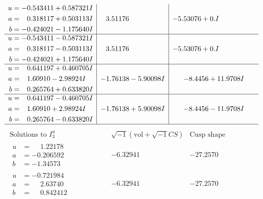 \documentclass[1p]{elsarticle_modified}
\theoremstyle{definition}
\newcommand{\I}{\sqrt{-1}}
\begin{document}
$$\begin{array}{c|c|c}
\begin{aligned}
u &= -0.543411 + 0.587321 I \\
a &= \phantom{-}0.318117 + 0.503113 I \\
b &= -0.424021 - 1.175640 I\end{aligned}
 & \phantom{-}3.51176\phantom{ +0.000000I} & -5.53076 + 0. I\phantom{ +0.000000I} \\ \hline\begin{aligned}
u &= -0.543411 - 0.587321 I \\
a &= \phantom{-}0.318117 - 0.503113 I \\
b &= -0.424021 + 1.175640 I\end{aligned}
 & \phantom{-}3.51176\phantom{ +0.000000I} & -5.53076 + 0. I\phantom{ +0.000000I} \\ \hline\begin{aligned}
u &= \phantom{-}0.641197 + 0.460705 I \\
a &= \phantom{-}1.60910 - 2.98924 I \\
b &= \phantom{-}0.265764 + 0.633820 I\end{aligned}
 & -1.76138 - 5.90098 I & -8.4456 + 11.9708 I \\ \hline\begin{aligned}
u &= \phantom{-}0.641197 - 0.460705 I \\
a &= \phantom{-}1.60910 + 2.98924 I \\
b &= \phantom{-}0.265764 - 0.633820 I\end{aligned}
 & -1.76138 + 5.90098 I & -8.4456 - 11.9708 I\\
 \hline 
 \end{array}$$\newpage$$\begin{array}{c|c|c}  
\text{Solutions to }I^u_{3}& \I (\text{vol} + \sqrt{-1}CS) & \text{Cusp shape}\\
 \hline 
\begin{aligned}
u &= \phantom{-}1.22178\phantom{ +0.000000I} \\
a &= -0.206592\phantom{ +0.000000I} \\
b &= -1.34573\phantom{ +0.000000I}\end{aligned}
 & -6.32941\phantom{ +0.000000I} & -27.2570\phantom{ +0.000000I} \\ \hline\begin{aligned}
u &= -0.721984\phantom{ +0.000000I} \\
a &= \phantom{-}2.63740\phantom{ +0.000000I} \\
b &= \phantom{-}0.842412\phantom{ +0.000000I}\end{aligned}
 & -6.32941\phantom{ +0.000000I} & -27.2570\phantom{ +0.000000I} \\ \hline\begin{aligned}

\end{aligned}
\end{array}$$
\end{document}
